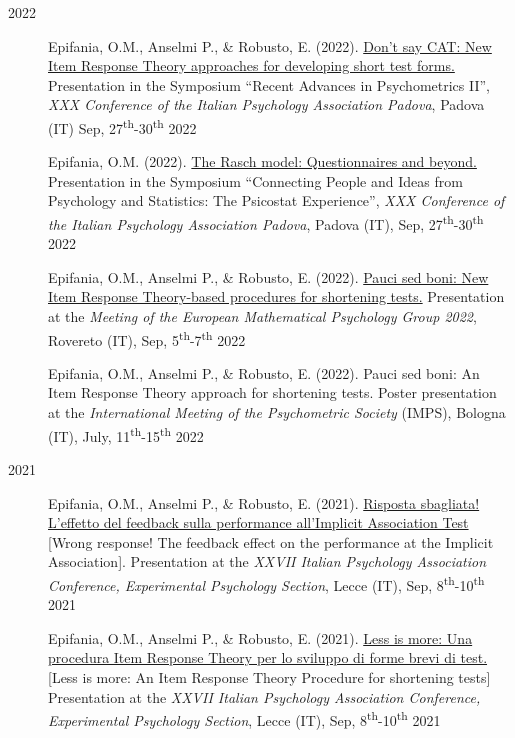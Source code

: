 \documentclass[letterpaper,12pt]{article}
\begin{document}
\begin{description}
	\item[2022]
	\item[] Epifania, O.M., Anselmi P., \& Robusto, E. (2022). \href{https://ottaviae.github.io/presentations/2022/aipIRT.pdf}{Don't say CAT: New Item Response Theory approaches for developing short test forms.} Presentation in the Symposium “Recent Advances in Psychometrics II”, \emph{XXX Conference of the Italian Psychology Association Padova}, Padova (IT) Sep, 27\textsuperscript{th}-30\textsuperscript{th} 2022
	
	\item[] Epifania, O.M. (2022). \href{https://ottaviae.github.io/presentations/2022/epifaniaRasch.pdf}{The Rasch model: Questionnaires and beyond.} Presentation in the Symposium “Connecting People and Ideas from Psychology and Statistics: The Psicostat Experience”, \emph{XXX Conference of the Italian Psychology Association Padova}, Padova (IT), Sep, 27\textsuperscript{th}-30\textsuperscript{th} 2022
	
		\item[] Epifania, O.M., Anselmi P., \& Robusto, E. (2022). \href{https://ottaviae.github.io/presentations/2022/presentationEpifania-empg.pdf}{Pauci sed boni: New Item Response Theory-based procedures for shortening tests.} Presentation at the \emph{Meeting of the European Mathematical Psychology Group 2022},  Rovereto (IT), Sep, 5\textsuperscript{th}-7\textsuperscript{th} 2022
	
	\item[] Epifania, O.M., Anselmi P., \& Robusto, E. (2022). Pauci sed boni: An Item Response Theory approach for shortening tests. Poster presentation at the \emph{International Meeting of the Psychometric Society} (IMPS), Bologna (IT), July, 11\textsuperscript{th}-15\textsuperscript{th} 2022
	
	\item[2021] 	
	\item[] Epifania, O.M., Anselmi P., \& Robusto, E. (2021). \href{https://ottaviae.github.io/presentations/2021/Risposta-sbagliata!.pdf}{Risposta sbagliata! L’effetto del feedback sulla performance all’Implicit Association Test} [Wrong response! The feedback effect on the performance at the Implicit Association]. Presentation at the \emph{XXVII Italian Psychology Association Conference, Experimental Psychology Section}, Lecce (IT), Sep, 8\textsuperscript{th}-10\textsuperscript{th} 2021
	
		\item[] Epifania, O.M., Anselmi P., \& Robusto, E. (2021). \href{https://ottaviae.github.io/presentations/2021/Less-is-more.pdf}{Less is more: Una procedura Item Response Theory per lo sviluppo di forme brevi di test.} [Less is more: An Item Response Theory Procedure for shortening tests] Presentation at the \emph{XXVII Italian Psychology Association Conference, Experimental Psychology Section}, Lecce (IT), Sep, 8\textsuperscript{th}-10\textsuperscript{th} 2021
		

\end{description}
\end{document}
